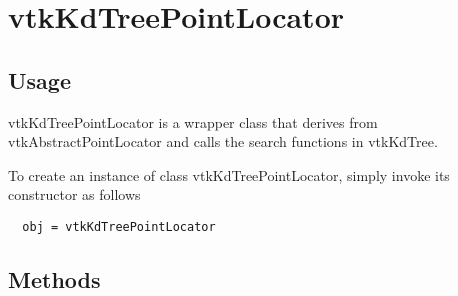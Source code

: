 \section{vtkKdTreePointLocator}

\subsection{Usage}

 vtkKdTreePointLocator is a wrapper class that derives from
 vtkAbstractPointLocator and calls the search functions in vtkKdTree.

To create an instance of class vtkKdTreePointLocator, simply
invoke its constructor as follows
\begin{verbatim}
  obj = vtkKdTreePointLocator
\end{verbatim}
\subsection{Methods}

